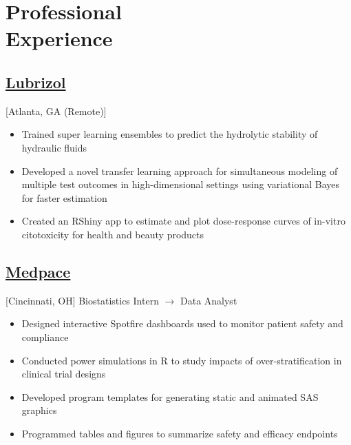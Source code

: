 \section{Professional \\ Experience}

\subsection{\href{https://www.lubrizol.com}{Lubrizol}}[Atlanta, GA (Remote)]
\begin{positions}
\end{positions}

\begin{itemize}
    \item Trained super learning ensembles to predict the hydrolytic stability of hydraulic fluids
    \item Developed a novel transfer learning approach for simultaneous modeling of multiple test outcomes in high-dimensional settings using variational Bayes for faster estimation
    \item Created an RShiny app to estimate and plot dose-response curves of in-vitro citotoxicity for health and beauty products
\end{itemize}

\subsection{\href{https://www.medpace.com}{Medpace}}[Cincinnati, OH]
\vspace{-\parskip}
Biostatistics Intern $\rightarrow$ Data Analyst \hfill {}

\begin{itemize}
  \item Designed interactive Spotfire dashboards used to monitor patient safety and compliance
  \item Conducted power simulations in R to study impacts of over-stratification in clinical trial designs
  \item Developed program templates for generating static and animated SAS graphics
  \item Programmed tables and figures to summarize safety and efficacy endpoints
\end{itemize}

